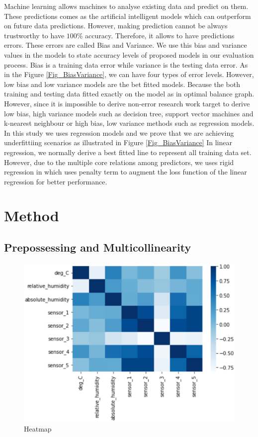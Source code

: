 Machine learning allows machines to analyse existing data and 
predict on them. These predictions comes as the 
artificial intelligent models which can outperform on future data predictions. 
However, making prediction cannot be always trustworthy 
to have $100\%$ accuracy. 
Therefore, it allows to have predictions errors. 
These errors are called Bias and Variance.
We use this bias and variance values in the models to state 
accuracy levels of proposed models in our evaluation process.
Bias is a training data error while variance is the testing data error.
As in the Figure \cref{Fig_BiasVariance}, we can have four types of error levels.
However, low bias and low variance models are the bet fitted models.
Because the both training and testing data fitted exactly on
the model as in optimal balance graph.
However, since it is impossible to derive non-error research
work target to derive low bias, high variance models such as
decision tree, support vector machines and k-nearest neighbour or high bias, low variance methods such as regression models.
In this study we uses regression models and we prove that
we are achieving underfittiing scenarios as illustrated in Figure \cref{Fig_BiasVariance}
In linear regression, we normally derive a best fitted line to represent all training data set.
However, due to the multiple core relations among predictors, we uses rigid regression in which uses penalty term to 
augment the loss function of the linear regression for better performance.

\gliMarker  %

\section{Method} \label{sec-method}

\subsection{Prepossessing and Multicollinearity}

\begin{figure}
  \centering
 \includegraphics[width=1.0\linewidth,height=0.8\linewidth]{graphics//Fig_heatmap.eps}
  \caption{Heatmap} \label{Heatmap}
\end{figure}


